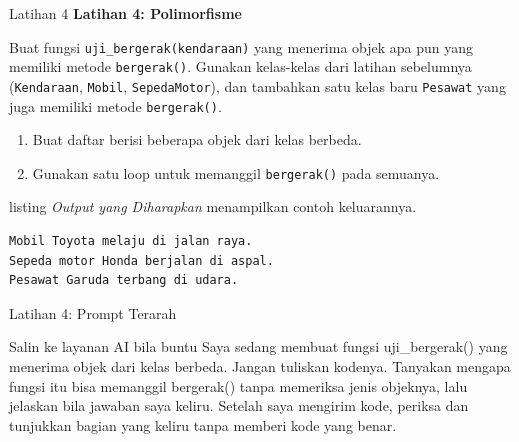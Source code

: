 \documentclass[aspectratio=169, table]{beamer}
\begin{document}
\begin{frame}[fragile,allowframebreaks=0.8]{Latihan 4}
\footnotesize
\textbf{Latihan 4: Polimorfisme}\par\medskip
Buat fungsi \texttt{uji\_bergerak(kendaraan)} yang menerima objek apa pun yang memiliki metode \texttt{bergerak()}.  
Gunakan kelas-kelas dari latihan sebelumnya (\texttt{Kendaraan}, \texttt{Mobil}, \texttt{SepedaMotor}), dan tambahkan satu kelas baru \texttt{Pesawat} yang juga memiliki metode \texttt{bergerak()}.

\begin{enumerate}
    \item Buat daftar berisi beberapa objek dari kelas berbeda.
    \item Gunakan satu loop untuk memanggil \texttt{bergerak()} pada semuanya.
\end{enumerate}

listing \textit{Output yang Diharapkan} menampilkan contoh keluarannya.

\begin{lstlisting}[language=bash, breaklines=true, basicstyle=\ttfamily\scriptsize]
Mobil Toyota melaju di jalan raya.
Sepeda motor Honda berjalan di aspal.
Pesawat Garuda terbang di udara.
\end{lstlisting}
\end{frame}

\begin{frame}{Latihan 4: Prompt Terarah}
\begin{block}{Salin ke layanan AI bila buntu}
\small Saya sedang membuat fungsi uji\_bergerak() yang menerima objek dari kelas berbeda. Jangan tuliskan kodenya. Tanyakan mengapa fungsi itu bisa memanggil bergerak() tanpa memeriksa jenis objeknya, lalu jelaskan bila jawaban saya keliru. Setelah saya mengirim kode, periksa dan tunjukkan bagian yang keliru tanpa memberi kode yang benar.
\end{block}
\end{frame}
\end{document}

